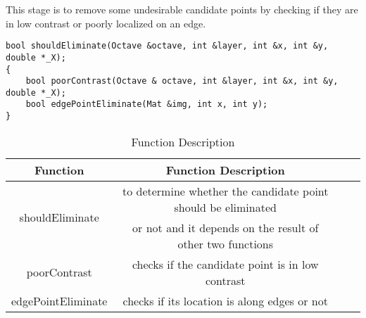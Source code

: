 \documentclass[paper=a4, fontsize=11pt]{scrartcl} %
\numberwithin{equation}{section} %
\numberwithin{figure}{section} %
\numberwithin{table}{section} %
\begin{document}
This stage is to remove some undesirable candidate points by checking if they are in low contrast or poorly localized on an edge.

\begin{lstlisting}
bool shouldEliminate(Octave &octave, int &layer, int &x, int &y, double *_X);
{
    bool poorContrast(Octave & octave, int &layer, int &x, int &y, double *_X);
    bool edgePointEliminate(Mat &img, int x, int y);
}
\end{lstlisting}

\begin{table}[h]
    \centering
    \begin{tabular}{|c|c| lp{}}
        \hline
        \textbf{Function} & \textbf{Function Description} \\\hline
\multirow{2}{*}{shouldEliminate} &  to determine whether the candidate point should be eliminated \\& or not and it depends on the result of other two functions\\\hline
poorContrast &  checks if the candidate point is in low contrast\\\hline
edgePointEliminate & checks if its location is along edges or not\\\hline
    \end{tabular}
    \caption{Function Description}\label{nolock}
\end{table}
\end{document}
